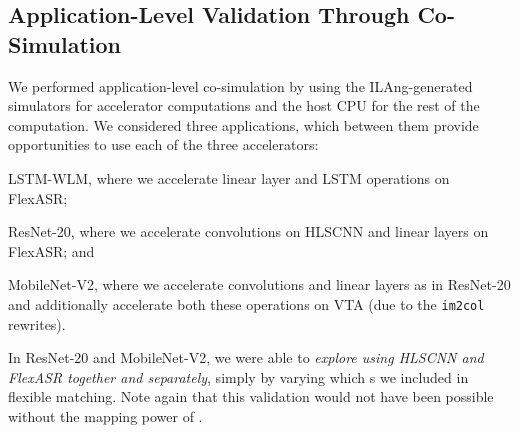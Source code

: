 \subsection{Application-Level Validation Through Co-Simulation}
\label{sec.end-to-end}

We performed application-level co-simulation
  by using the
  ILAng-generated simulators for accelerator computations
  and the host CPU for the rest of the computation.
%
%
We considered three applications,
  which between them provide opportunities to use
  each of the three accelerators: %
\begin{inlinelist}
  \item LSTM-WLM, where we accelerate linear layer and LSTM operations on FlexASR;
  \item ResNet-20, where we accelerate convolutions on HLSCNN and linear layers on FlexASR; and
  \item MobileNet-V2, where we accelerate convolutions and linear layers as in ResNet-20 and additionally accelerate both these operations on VTA (due to the \texttt{im2col} rewrites).
\end{inlinelist}
In ResNet-20 and MobileNet-V2,
  we were able to
  \emph{explore using HLSCNN and FlexASR together and separately}, simply by varying which 
  {\mapping}s
  we included in flexible matching.
Note again that this validation
  would not have been possible without the mapping power
  of \g.

